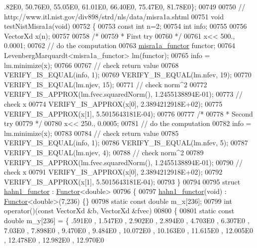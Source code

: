 \begin{DoxyCode}
      .82E0, 50.76E0, 55.05E0, 61.01E0, 66.40E0, 75.47E0, 81.78E0\};
00749 
00750 \textcolor{comment}{// http://www.itl.nist.gov/div898/strd/nls/data/misra1a.shtml}
00751 \textcolor{keywordtype}{void} testNistMisra1a(\textcolor{keywordtype}{void})
00752 \{
00753   \textcolor{keyword}{const} \textcolor{keywordtype}{int} n=2;
00754   \textcolor{keywordtype}{int} info;
00755 
00756   VectorXd x(n);
00757 
00758   \textcolor{comment}{/*}
00759 \textcolor{comment}{   * First try}
00760 \textcolor{comment}{   */}
00761   x<< 500., 0.0001;
00762   \textcolor{comment}{// do the computation}
00763   \hyperlink{structmisra1a__functor}{misra1a\_functor} functor;
00764   LevenbergMarquardt<misra1a\_functor> lm(functor);
00765   info = lm.minimize(x);
00766 
00767   \textcolor{comment}{// check return value}
00768   VERIFY\_IS\_EQUAL(info, 1);
00769   VERIFY\_IS\_EQUAL(lm.nfev, 19);
00770   VERIFY\_IS\_EQUAL(lm.njev, 15);
00771   \textcolor{comment}{// check norm^2}
00772   VERIFY\_IS\_APPROX(lm.fvec.squaredNorm(), 1.2455138894E-01);
00773   \textcolor{comment}{// check x}
00774   VERIFY\_IS\_APPROX(x[0], 2.3894212918E+02);
00775   VERIFY\_IS\_APPROX(x[1], 5.5015643181E-04);
00776 
00777   \textcolor{comment}{/*}
00778 \textcolor{comment}{   * Second try}
00779 \textcolor{comment}{   */}
00780   x<< 250., 0.0005;
00781   \textcolor{comment}{// do the computation}
00782   info = lm.minimize(x);
00783 
00784   \textcolor{comment}{// check return value}
00785   VERIFY\_IS\_EQUAL(info, 1);
00786   VERIFY\_IS\_EQUAL(lm.nfev, 5);
00787   VERIFY\_IS\_EQUAL(lm.njev, 4);
00788   \textcolor{comment}{// check norm^2}
00789   VERIFY\_IS\_APPROX(lm.fvec.squaredNorm(), 1.2455138894E-01);
00790   \textcolor{comment}{// check x}
00791   VERIFY\_IS\_APPROX(x[0], 2.3894212918E+02);
00792   VERIFY\_IS\_APPROX(x[1], 5.5015643181E-04);
00793 \}
00794 
00795 \textcolor{keyword}{struct }\hyperlink{structhahn1__functor}{hahn1\_functor} : \hyperlink{struct_functor}{Functor}<double>
00796 \{
00797     \hyperlink{structhahn1__functor}{hahn1\_functor}(\textcolor{keywordtype}{void}) : \hyperlink{struct_functor}{Functor}<double>(7,236) \{\}
00798     \textcolor{keyword}{static} \textcolor{keyword}{const} \textcolor{keywordtype}{double} m\_x[236];
00799     \textcolor{keywordtype}{int} operator()(\textcolor{keyword}{const} VectorXd &b, VectorXd &fvec)
00800     \{
00801         \textcolor{keyword}{static} \textcolor{keyword}{const} \textcolor{keywordtype}{double} m\_y[236] = \{ .591E0 , 1.547E0 , 2.902E0 , 2.894E0 , 4.703E0 , 6.307E0 , 7.03E0 
       , 7.898E0 , 9.470E0 , 9.484E0 , 10.072E0 , 10.163E0 , 11.615E0 , 12.005E0 , 12.478E0 , 12.982E0 , 12.970E0 

\end{DoxyCode}
